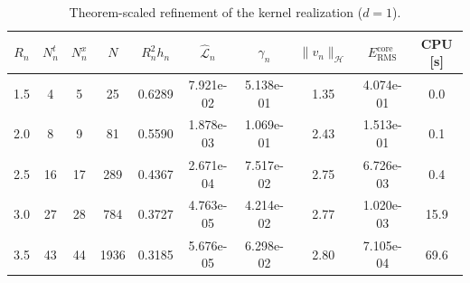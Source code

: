 \begin{table}[!ht]
  \centering
  \small
  \caption{Theorem-scaled refinement of the kernel realization ($d=1$).}
  \label{tab:ker.theory_d1}
  \begin{tabular}{cccccccccc}
    \toprule
    $R_n$ & $N^t_n$ & $N^x_n$ & $N$ & $R_n^2h_n$ & $\widehat{\mathcal L}_n$ & $\gamma_n$ & $\|v_n\|_{\mathcal H}$ & $E_{\mathrm{RMS}}^{\mathrm{core}}$ & CPU [s] \\
    \midrule
    1.5 & 4 & 5 & 25 & 0.6289 & 7.921e-02 & 5.138e-01 & 1.35 & 4.074e-01 & 0.0 \\
    2.0 & 8 & 9 & 81 & 0.5590 & 1.878e-03 & 1.069e-01 & 2.43 & 1.513e-01 & 0.1 \\
    2.5 & 16 & 17 & 289 & 0.4367 & 2.671e-04 & 7.517e-02 & 2.75 & 6.726e-03 & 0.4 \\
    3.0 & 27 & 28 & 784 & 0.3727 & 4.763e-05 & 4.214e-02 & 2.77 & 1.020e-03 & 15.9 \\
    3.5 & 43 & 44 & 1936 & 0.3185 & 5.676e-05 & 6.298e-02 & 2.80 & 7.105e-04 & 69.6 \\
    \bottomrule
  \end{tabular}
\end{table}
